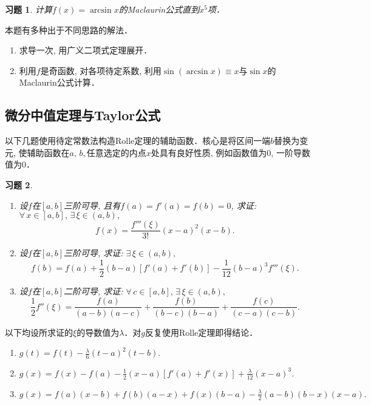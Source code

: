 \documentclass[11pt,a4paper]{ctexart}
\makeatletter
\theoremstyle{thmseries} %
\theoremstyle{exerseries}
\newtheorem{exer}{习题}[section]
\renewenvironment{proof}[1][\proofname]{\par
  \pushQED{\qed}%
  \normalfont \topsep6\p@\@plus6\p@\relax
  \trivlist
  \item[\hskip\labelsep
        \itshape
    #1\@addpunct{}]\ignorespaces
}{%
  \popQED\endtrivlist\@endpefalse
}
\newenvironment{sol}{\begin{proof}[\bfseries\upshape 解\quad]}{\end{proof}}
\newenvironment{pf}{\begin{proof}[\bfseries\upshape 证\quad]}{\end{proof}}
\newcommand{\sbra}[1]{\mathopen{}\left[#1\right]}
\makeatother
\begin{document}
\begin{exer}
	计算$f(x)=\arcsin x$的Maclaurin公式直到$x^5$项．
\end{exer}
\begin{sol}
	本题有多种出于不同思路的解法．
	\begin{enumerate}
		\item 求导一次, 用广义二项式定理展开．
		\item 利用$f$是奇函数, 对各项待定系数, 利用$\sin(\arcsin x)\equiv x$与$\sin x$的Maclaurin公式计算．\qedhere
	\end{enumerate}
\end{sol}


\subsection{微分中值定理与Taylor公式}
以下几题使用待定常数法构造Rolle定理的辅助函数．核心是将区间一端$b$替换为变元, 使辅助函数在$a,\,b,$任意选定的内点$x$处具有良好性质, 例如函数值为0, 一阶导数值为0．
\begin{exer}
	\phantom{text}
	\begin{enumerate}
		\item 设$f$在$[a,b]$三阶可导, 且有$f(a)=f'(a)=f(b)=0$, 求证: $\forall\,x\in[a,b],\,\exists\,\xi\in(a,b),$
		\[f(x)=\frac{f'''(\xi)}{3!}(x-a)^2(x-b).\]
		\item 设$f$在$[a,b]$三阶可导, 求证: $\exists\,\xi\in(a,b),$
		\[f(b)=f(a)+\frac{1}{2}(b-a)[f'(a)+f'(b)]-\frac{1}{12}(b-a)^3f'''(\xi).\]
		\item 设$f$在$[a,b]$二阶可导, 求证: $\forall\,c\in[a,b],\,\exists\,\xi\in(a,b),$
		\[\frac{1}{2}f''(\xi)=\frac{f(a)}{(a-b)(a-c)}+\frac{f(b)}{(b-c)(b-a)}+\frac{f(c)}{(c-a)(c-b)}.\]
	\end{enumerate}
\end{exer}
\begin{pf}
	以下均设所求证的$\xi$的导数值为$\lambda$．对$g$反复使用Rolle定理即得结论．
	\begin{enumerate}
		\item $g(t)=f(t)-\frac{\lambda}{6}(t-a)^2(t-b).$
		\item $g(x)=f(x)-f(a)-\frac{1}{2}(x-a)\sbra{f'(a)+f'(x)}+\frac{\lambda}{12}(x-a)^3.$
		\item $g(x)=f(a)(x-b)+f(b)(a-x)+f(x)(b-a)-\frac{\lambda}{2}(a-b)(b-x)(x-a).$\qedhere
	\end{enumerate}
\end{pf}
\end{document}
